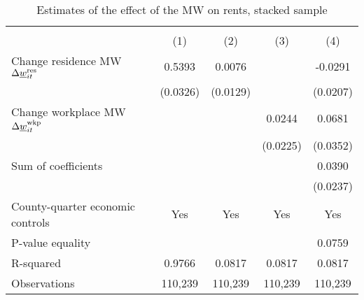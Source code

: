 \begin{table}[hbt!] \centering
    \caption{Estimates of the effect of the MW on rents, stacked sample}
    \label{tab:stacked_w6}
    \begin{tabular}{l*{4}{c}}
        \toprule
        & 
            &  \\ \cmidrule(lr){2-2}\cmidrule(lr){3-5}
                                            & (1)   & (2)   & (3)   & (4)            \\ \midrule
        Change residence MW 
                    $\Delta\underline{w}_{it}^{\text{res}}$  &  0.5393  &  0.0076  &       &  -0.0291     \\
                                            & (0.0326) & (0.0129) &       & (0.0207)    \\
        Change workplace MW 
                    $\Delta\underline{w}_{it}^{\text{wkp}}$ &       &       &  0.0244  & 0.0681      \\
                                            &       &       & (0.0225) & (0.0352)    \\ \midrule
        Sum of coefficients                &       &       &       &  0.0390     \\
                                            &       &       &       & (0.0237)    \\ \midrule
        County-quarter economic controls   &  Yes  & Yes   & Yes   & Yes      \\
        P-value equality                   &       &       &       & 0.0759      \\
        R-squared                          &  0.9766  &  0.0817  &  0.0817  & 0.0817      \\
        Observations                       & 110,239  & 110,239  & 110,239  & 110,239     \\\bottomrule
    \end{tabular}


\end{table}
